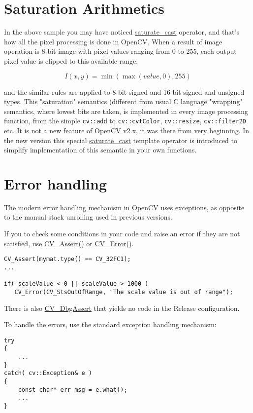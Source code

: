 \section{Saturation Arithmetics}

In the above sample you may have noticed \hyperref[saturatecast]{saturate\_cast} operator, and that's how all the pixel processing is done in OpenCV. When a result of image operation is 8-bit image with pixel values ranging from 0 to 255, each output pixel value is clipped to this available range:

\[
I(x,y)=\min(\max(value, 0), 255)
\]

and the similar rules are applied to 8-bit signed and 16-bit signed and unsigned types. This "saturation" semantics (different from usual C language "wrapping" semantics, where lowest bits are taken, is implemented in every image processing function, from the simple \texttt{cv::add} to 
\texttt{cv::cvtColor}, \texttt{cv::resize}, \texttt{cv::filter2D} etc.
It is not a new feature of OpenCV v2.x, it was there from very beginning. In the new version this special \hyperref[saturatecast]{saturate\_cast} template operator is introduced to simplify implementation of this semantic in your own functions.


\section{Error handling}

The modern error handling mechanism in OpenCV uses exceptions, as opposite to the manual stack unrolling used in previous versions.

If you to check some conditions in your code and raise an error if they are not satisfied, use \hyperref[CV Assert]{CV\_Assert}() or \hyperref[cppfunc.error]{CV\_Error}().

\begin{lstlisting}
CV_Assert(mymat.type() == CV_32FC1);
...

if( scaleValue < 0 || scaleValue > 1000 )
   CV_Error(CV_StsOutOfRange, "The scale value is out of range");
\end{lstlisting}

There is also \hyperref[CV Assert]{CV\_DbgAssert} that yields no code in the Release configuration.

To handle the errors, use the standard exception handling mechanism:

\begin{lstlisting}
try
{
    ...
}
catch( cv::Exception& e )
{
    const char* err_msg = e.what();
    ...
}
\end{lstlisting}
 
